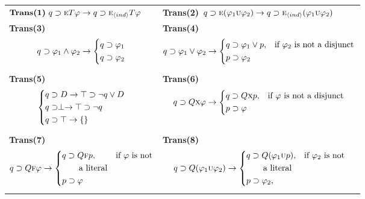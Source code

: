 \documentclass[letterpaper]{article} %
\begin{document}
\begin{table*}[]
    \centering
    \footnotesize
    \begin{tabular}{l l}
    \hline
   $\textbf{Trans(1)}\  q \supset \textsc{e} T \varphi \rightarrow q\supset \textsc{e}_{{\langle{ind}\rangle}} T \varphi$  & \textbf{Trans(2)}\  $q \supset \textsc{e} (\varphi_1 \textsc{u} \varphi_2) \rightarrow q\supset \textsc{e}_{{\langle{ind}\rangle}} (\varphi_1 \textsc{u} \varphi_2)$  \\
   
   \textbf{Trans(3)}\  $$ q\supset \varphi_1 \wedge \varphi_2 \rightarrow \left\{
\begin{aligned}
& q\supset \varphi_1 \\
& q\supset \varphi_2
\end{aligned}
\right.
$$  &
\textbf{Trans(4)} 
$$ q\supset \varphi_1 \vee \varphi_2 \rightarrow \left\{
\begin{aligned}
& q\supset \varphi_1 \vee p, && \hbox{if $\varphi_2$ is not a disjunct}\\
& p\supset \varphi_2
\end{aligned}
\right.
$$    \\
\textbf{Trans(5)} 
$$ \left\{
\begin{aligned}
& q\supset D \rightarrow \top \supset \neg q \vee D\\
& q\supset \perp\rightarrow \top \supset \neg q \\
& q \supset \top \rightarrow \{\}
\end{aligned}
\right.
 $$ & \textbf{Trans(6)} 
 $$ q\supset Q\textsc{x} \varphi \rightarrow \left\{
 \begin{aligned}
 & q\supset Q\textsc{x} p, && \hbox{if $\varphi$ is not a disjunct}\\
 & p\supset \varphi
 \end{aligned} 
 \right.
 $$\\
 
 \textbf{Trans(7)} 
 $$ q\supset Q\textsc{f} \varphi\rightarrow \left\{
 \begin{aligned}
& q\supset Q\textsc{f} p, && \hbox{if $\varphi$ is not}\\
 & \qquad  \hbox{a literal}\\
 & p\supset \varphi  
 \end{aligned}
  \right.
  $$&  \textbf{Trans(8)} $$ q\supset Q(\varphi_1 \textsc{u} \varphi_2) \rightarrow \left\{
 \begin{aligned}
 & q\supset Q(\varphi_1 \textsc{u} p), && \hbox{if $\varphi_2$ is not}\\
 & \qquad \hbox{a literal} \\
 & p\supset \varphi_2, 
    \end{aligned} 
  \right.$$ \\
  

\end{tabular}
\end{table*}
\end{document}
